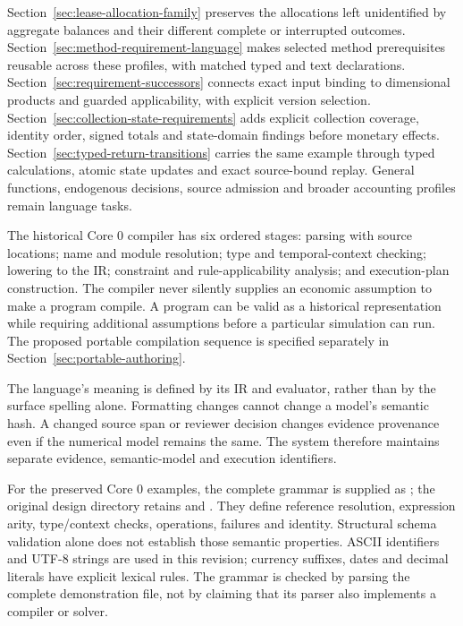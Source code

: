 Section~\ref{sec:lease-allocation-family} preserves the allocations left
unidentified by aggregate balances and their different complete or interrupted outcomes.
Section~\ref{sec:method-requirement-language} makes selected method prerequisites
reusable across these profiles, with matched typed and text declarations.
Section~\ref{sec:requirement-successors} connects exact input binding to
dimensional products and guarded applicability, with explicit version selection.
Section~\ref{sec:collection-state-requirements} adds explicit collection coverage,
identity order, signed totals and state-domain findings before monetary effects.
Section~\ref{sec:typed-return-transitions} carries the same example through
typed calculations, atomic state updates and exact source-bound replay.
General functions,
endogenous decisions, source admission and broader accounting profiles remain
language tasks.

The historical Core 0 compiler has six ordered stages: parsing with source locations; name and
module resolution; type and temporal-context checking; lowering to the IR;
constraint and rule-applicability analysis; and execution-plan construction.
The compiler never silently supplies an economic assumption to make a program
compile. A program can be valid as a historical representation while requiring
additional assumptions before a particular simulation can run.
The proposed portable compilation sequence is specified separately in
Section~\ref{sec:portable-authoring}.

The language's meaning is defined by its IR and evaluator, rather than by the
surface spelling alone. Formatting changes cannot change a model's semantic
hash. A changed source span or reviewer decision changes evidence provenance
even if the numerical model remains the same. The system therefore maintains
separate evidence, semantic-model and execution identifiers.

For the preserved Core 0 examples, the complete grammar is supplied as
; the original design directory retains
 and . They define reference resolution, expression arity,
type/context checks, operations, failures and identity. Structural schema
validation alone does not establish those semantic properties. ASCII
identifiers and UTF-8 strings are used in this revision; currency suffixes,
dates and decimal literals have explicit lexical rules. The grammar is checked
by parsing the complete demonstration file, not by claiming that its parser
also implements a compiler or solver.

